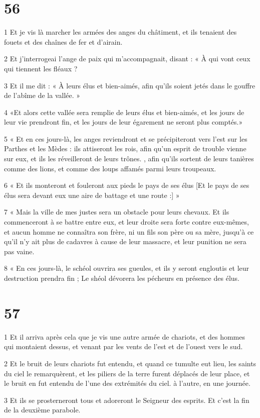 \chapter{56}

\par 1 Et je vis là marcher les armées des anges du châtiment, et ils tenaient des fouets et des chaînes de fer et d'airain.
\par 2 Et j'interrogeai l'ange de paix qui m'accompagnait, disant : « À qui vont ceux qui tiennent les fléaux ?
\par 3 Et il me dit : « À leurs élus et bien-aimés, afin qu'ils soient jetés dans le gouffre de l'abîme de la vallée. »
\par 4 «Et alors cette vallée sera remplie de leurs élus et bien-aimés, et les jours de leur vie prendront fin, et les jours de leur égarement ne seront plus comptés.»
\par 5 « Et en ces jours-là, les anges reviendront et se précipiteront vers l'est sur les Parthes et les Mèdes : ils attiseront les rois, afin qu'un esprit de trouble vienne sur eux, et ils les réveilleront de leurs trônes. , afin qu'ils sortent de leurs tanières comme des lions, et comme des loups affamés parmi leurs troupeaux.
\par 6 « Et ils monteront et fouleront aux pieds le pays de ses élus [Et le pays de ses élus sera devant eux une aire de battage et une route :] »
\par 7 « Mais la ville de mes justes sera un obstacle pour leurs chevaux. Et ils commenceront à se battre entre eux, et leur droite sera forte contre eux-mêmes, et aucun homme ne connaîtra son frère, ni un fils son père ou sa mère, jusqu'à ce qu'il n'y ait plus de cadavres à cause de leur massacre, et leur punition ne sera pas vaine.
\par 8 « En ces jours-là, le schéol ouvrira ses gueules, et ils y seront engloutis et leur destruction prendra fin ; Le shéol dévorera les pécheurs en présence des élus.

\chapter{57}

\par 1 Et il arriva après cela que je vis une autre armée de chariots, et des hommes qui montaient dessus, et venant par les vents de l'est et de l'ouest vers le sud.
\par 2 Et le bruit de leurs chariots fut entendu, et quand ce tumulte eut lieu, les saints du ciel le remarquèrent, et les piliers de la terre furent déplacés de leur place, et le bruit en fut entendu de l'une des extrémités du ciel. à l'autre, en une journée.
\par 3 Et ils se prosterneront tous et adoreront le Seigneur des esprits. Et c'est la fin de la deuxième parabole.

